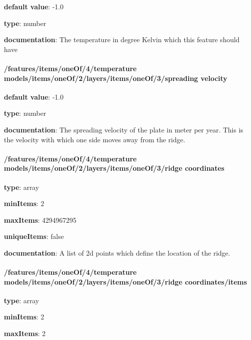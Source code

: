 \begin{itemized}
\item {\bf default value}: -1.0
\item {\bf type}: number
\item {\bf documentation}: The temperature in degree Kelvin which this feature should have
\end{itemized}\paragraph{/features/items/oneOf/4/temperature models/items/oneOf/2/layers/items/oneOf/3/spreading velocity} \begin{itemized}
\item {\bf default value}: -1.0
\item {\bf type}: number
\item {\bf documentation}: The spreading velocity of the plate in meter per year. This is the velocity with which one side moves away from the ridge.
\end{itemized}\paragraph{/features/items/oneOf/4/temperature models/items/oneOf/2/layers/items/oneOf/3/ridge coordinates} \begin{itemized}
\item {\bf type}: array
\item {\bf minItems}: 2
\item {\bf maxItems}: 4294967295
\item {\bf uniqueItems}: false
\item {\bf documentation}: A list of 2d points which define the location of the ridge.
\paragraph{/features/items/oneOf/4/temperature models/items/oneOf/2/layers/items/oneOf/3/ridge coordinates/items} \begin{itemized}
\item {\bf type}: array
\item {\bf minItems}: 2
\item {\bf maxItems}: 2

\end{itemized}
\end{itemized}

